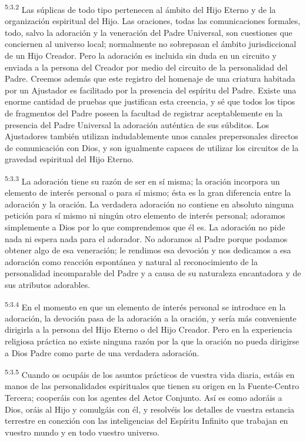 \par
\textsuperscript{5:3.2} Las súplicas de todo tipo pertenecen al ámbito del Hijo Eterno y de la organización espiritual del Hijo. Las oraciones, todas las comunicaciones formales, todo, salvo la adoración y la veneración del Padre Universal, son cuestiones que conciernen al universo local; normalmente no sobrepasan el ámbito jurisdiccional de un Hijo Creador. Pero la adoración es incluida sin duda en un circuito y enviada a la persona del Creador por medio del circuito de la personalidad del Padre. Creemos además que este registro del homenaje de una criatura habitada por un Ajustador es facilitado por la presencia del espíritu del Padre. Existe una enorme cantidad de pruebas que justifican esta creencia, y sé que todos los tipos de fragmentos del Padre poseen la facultad de registrar aceptablemente en la presencia del Padre Universal la adoración auténtica de sus súbditos. Los Ajustadores también utilizan indudablemente unos canales prepersonales directos de comunicación con Dios, y son igualmente capaces de utilizar los circuitos de la gravedad espiritual del Hijo Eterno.

\par
\textsuperscript{5:3.3} La adoración tiene su razón de ser en sí misma; la oración incorpora un elemento de interés personal o para sí mismo; ésta es la gran diferencia entre la adoración y la oración. La verdadera adoración no contiene en absoluto ninguna petición para sí mismo ni ningún otro elemento de interés personal; adoramos simplemente a Dios por lo que comprendemos que él es. La adoración no pide nada ni espera nada para el adorador. No adoramos al Padre porque podamos obtener algo de esa veneración; le rendimos esa devoción y nos dedicamos a esa adoración como reacción espontánea y natural al reconocimiento de la personalidad incomparable del Padre y a causa de su naturaleza encantadora y de sus atributos adorables.

\par
\textsuperscript{5:3.4} En el momento en que un elemento de interés personal se introduce en la adoración, la devoción pasa de la adoración a la oración, y sería más conveniente dirigirla a la persona del Hijo Eterno o del Hijo Creador. Pero en la experiencia religiosa práctica no existe ninguna razón por la que la oración no pueda dirigirse a Dios Padre como parte de una verdadera adoración.

\par
\textsuperscript{5:3.5} Cuando os ocupáis de los asuntos prácticos de vuestra vida diaria, estáis en manos de las personalidades espirituales que tienen su origen en la Fuente-Centro Tercera; cooperáis con los agentes del Actor Conjunto. Así es como adoráis a Dios, oráis al Hijo y comulgáis con él, y resolvéis los detalles de vuestra estancia terrestre en conexión con las inteligencias del Espíritu Infinito que trabajan en vuestro mundo y en todo vuestro universo.

